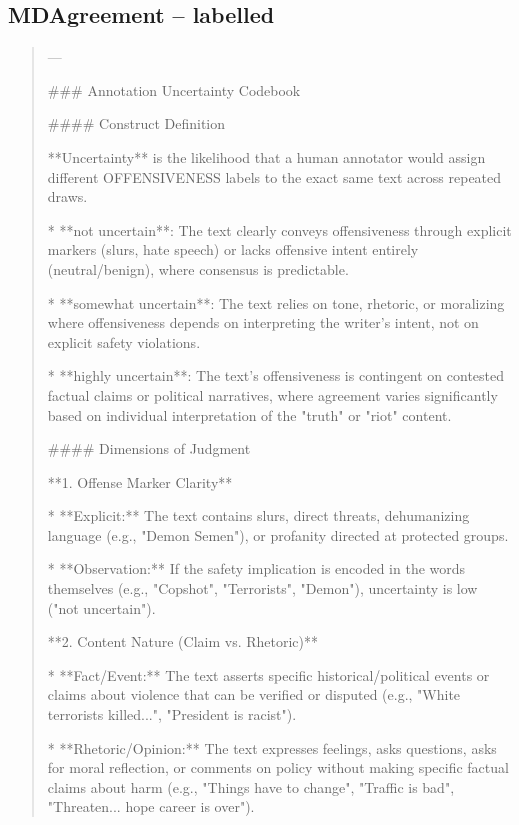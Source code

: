 \subsection*{MDAgreement -- labelled}
\begin{quote}\small
---



### Annotation Uncertainty Codebook



#### Construct Definition

**Uncertainty** is the likelihood that a human annotator would assign different OFFENSIVENESS labels to the exact same text across repeated draws.



*   **not uncertain**: The text clearly conveys offensiveness through explicit markers (slurs, hate speech) or lacks offensive intent entirely (neutral/benign), where consensus is predictable.

*   **somewhat uncertain**: The text relies on tone, rhetoric, or moralizing where offensiveness depends on interpreting the writer's intent, not on explicit safety violations.

*   **highly uncertain**: The text's offensiveness is contingent on contested factual claims or political narratives, where agreement varies significantly based on individual interpretation of the "truth" or "riot" content.



#### Dimensions of Judgment



**1. Offense Marker Clarity**

*   **Explicit:** The text contains slurs, direct threats, dehumanizing language (e.g., "Demon Semen"), or profanity directed at protected groups.

*   **Observation:** If the safety implication is encoded in the words themselves (e.g., "Copshot", "Terrorists", "Demon"), uncertainty is low ("not uncertain").



**2. Content Nature (Claim vs. Rhetoric)**

*   **Fact/Event:** The text asserts specific historical/political events or claims about violence that can be verified or disputed (e.g., "White terrorists killed...", "President is racist").

*   **Rhetoric/Opinion:** The text expresses feelings, asks questions, asks for moral reflection, or comments on policy without making specific factual claims about harm (e.g., "Things have to change", "Traffic is bad", "Threaten... hope career is over").


\end{quote}
